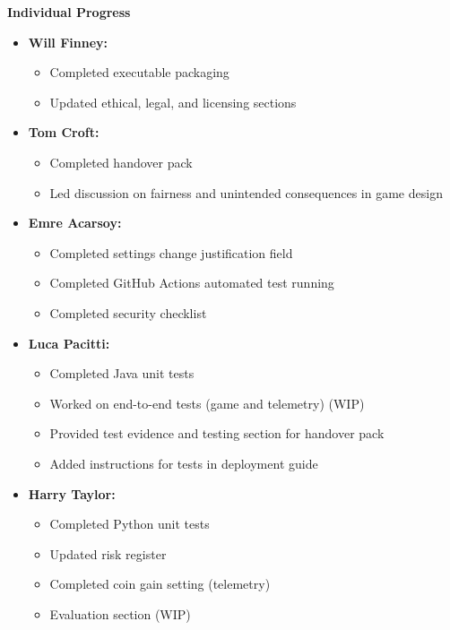 \documentclass[11pt]{article}
\begin{document}
    \textbf{Individual Progress}
    \begin{itemize}
        \item \textbf{Will Finney:}
        \begin{itemize}
            \item Completed executable packaging
            \item Updated ethical, legal, and licensing sections
        \end{itemize}

        \item \textbf{Tom Croft:}
        \begin{itemize}
            \item Completed handover pack
            \item Led discussion on fairness and unintended consequences in game design
        \end{itemize}

        \item \textbf{Emre Acarsoy:}
        \begin{itemize}
            \item Completed settings change justification field
            \item Completed GitHub Actions automated test running
            \item Completed security checklist
        \end{itemize}

        \item \textbf{Luca Pacitti:}
        \begin{itemize}
            \item Completed Java unit tests
            \item Worked on end-to-end tests (game and telemetry) (WIP)
            \item Provided test evidence and testing section for handover pack
            \item Added instructions for tests in deployment guide
        \end{itemize}

        \item \textbf{Harry Taylor:}
        \begin{itemize}
            \item Completed Python unit tests
            \item Updated risk register
            \item Completed coin gain setting (telemetry)
            \item Evaluation section (WIP)
        \end{itemize}


\end{itemize}
\end{document}
